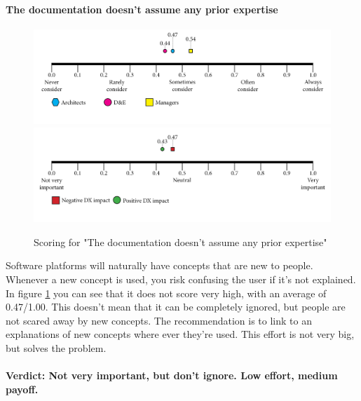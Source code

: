     \paragraph{The documentation doesn’t assume any prior expertise}
    \begin{figure}[H]
        \centering
        \includegraphics[width=\linewidth]{scorelines/aspect5.png}
        \includegraphics[width=\linewidth]{dxscorelines/dxaspect5.png}
        \caption{Scoring for "The documentation doesn’t assume any prior expertise"}
        \label{fig:aspect5}
    \end{figure}
    Software platforms will naturally have concepts that are new to people. Whenever a new concept is used, you risk confusing the user if it's not explained. In figure \ref{fig:aspect5} you can see that it does not score very high, with an average of 0.47/1.00. This doesn't mean that it can be completely ignored, but people are not scared away by new concepts. The recommendation is to link to an explanations of new concepts where ever they're used. This effort is not very big, but solves the problem. \\ \\
    \textbf{Verdict: Not very important, but don't ignore. Low effort, medium payoff.}
